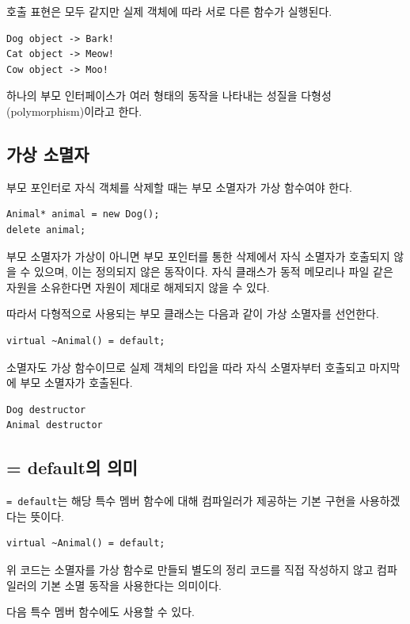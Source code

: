\documentclass[11pt,a4paper]{article}
\begin{document}
호출 표현은 모두 같지만 실제 객체에 따라 서로 다른 함수가 실행된다.

\begin{verbatim}
Dog object -> Bark!
Cat object -> Meow!
Cow object -> Moo!
\end{verbatim}

하나의 부모 인터페이스가 여러 형태의 동작을 나타내는 성질을 다형성(polymorphism)이라고 한다.

\subsection{가상 소멸자}
부모 포인터로 자식 객체를 삭제할 때는 부모 소멸자가 가상 함수여야 한다.

\begin{lstlisting}
Animal* animal = new Dog();
delete animal;
\end{lstlisting}

부모 소멸자가 가상이 아니면 부모 포인터를 통한 삭제에서 자식 소멸자가 호출되지 않을 수 있으며, 이는 정의되지 않은 동작이다. 자식 클래스가 동적 메모리나 파일 같은 자원을 소유한다면 자원이 제대로 해제되지 않을 수 있다.

따라서 다형적으로 사용되는 부모 클래스는 다음과 같이 가상 소멸자를 선언한다.

\begin{lstlisting}
virtual ~Animal() = default;
\end{lstlisting}

소멸자도 가상 함수이므로 실제 객체의 타입을 따라 자식 소멸자부터 호출되고 마지막에 부모 소멸자가 호출된다.

\begin{verbatim}
Dog destructor
Animal destructor
\end{verbatim}

\subsection{= default의 의미}
\texttt{= default}는 해당 특수 멤버 함수에 대해 컴파일러가 제공하는 기본 구현을 사용하겠다는 뜻이다.

\begin{lstlisting}
virtual ~Animal() = default;
\end{lstlisting}

위 코드는 소멸자를 가상 함수로 만들되 별도의 정리 코드를 직접 작성하지 않고 컴파일러의 기본 소멸 동작을 사용한다는 의미이다.

다음 특수 멤버 함수에도 사용할 수 있다.
\end{document}
